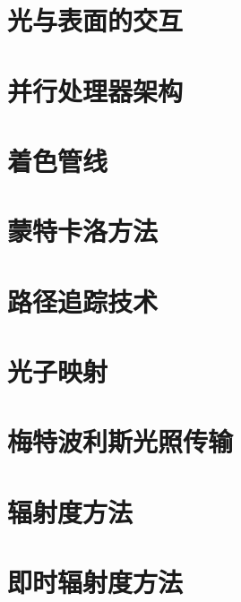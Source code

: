 
\chapter{光与表面的交互}
\label{chp:intro}
\minitoc


	


\chapter{并行处理器架构}
\label{chp:hardware}
\minitoc


\chapter{着色管线}
\label{chp:shading}
\minitoc


\chapter{蒙特卡洛方法}
\label{chp:mc}
\minitoc


\chapter{路径追踪技术}
\label{chp:path-tracing}
\minitoc


\chapter{光子映射}
\label{chp:pm}
\minitoc


\chapter{梅特波利斯光照传输}
\label{chp:mlt}
\minitoc


\chapter{辐射度方法}
\label{chp:rad}
\minitoc


\chapter{即时辐射度方法}
\label{chp:ir}
\minitoc


